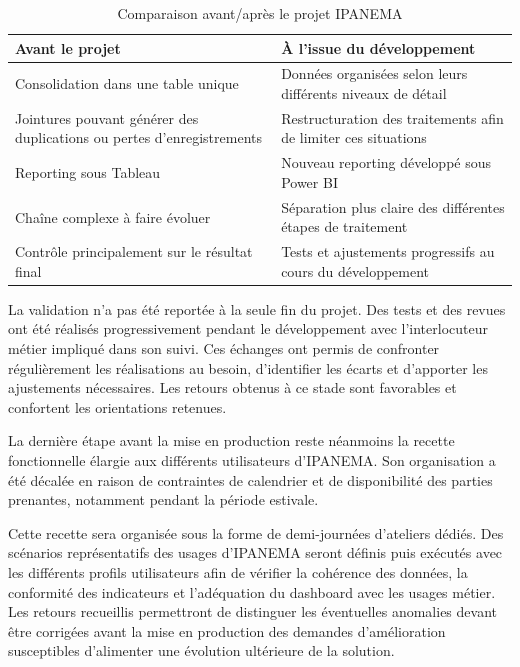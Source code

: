 \begin{table}[!ht]
\centering
\caption{Comparaison avant/après le projet IPANEMA}
\label{tab:avant-apres-ipanema}
\vspace{6pt}
\renewcommand{\arraystretch}{1.5} %
\setlength{\tabcolsep}{10pt}     %
\begin{tabular}{|>{\raggedright\arraybackslash}p{5cm}|>{\raggedright\arraybackslash}p{8.5cm}|}
\hline
\textbf{Avant le projet} & \textbf{À l'issue du développement} \\
\hline
Consolidation dans une table unique & Données organisées selon leurs différents niveaux de détail \\
\hline
Jointures pouvant générer des duplications ou pertes d'enregistrements & Restructuration des traitements afin de limiter ces situations \\
\hline
Reporting sous Tableau & Nouveau reporting développé sous Power BI \\
\hline
Chaîne complexe à faire évoluer & Séparation plus claire des différentes étapes de traitement \\
\hline
Contrôle principalement sur le résultat final & Tests et ajustements progressifs au cours du développement \\
\hline
\end{tabular}
\end{table}

La validation n'a pas été reportée à la seule fin du projet. Des tests et des revues ont 
été réalisés progressivement pendant le développement avec l'interlocuteur métier impliqué 
dans son suivi. Ces échanges ont permis de confronter régulièrement les réalisations au 
besoin, d'identifier les écarts et d'apporter les ajustements nécessaires. Les retours obtenus à 
ce stade sont favorables et confortent les orientations retenues.

La dernière étape avant la mise en production reste néanmoins la recette fonctionnelle 
élargie aux différents utilisateurs d'IPANEMA. Son organisation a été décalée en raison de 
contraintes de calendrier et de disponibilité des parties prenantes, notamment pendant la 
période estivale. 

Cette recette sera organisée sous la forme de demi-journées d'ateliers dédiés. Des 
scénarios représentatifs des usages d'IPANEMA seront définis puis exécutés avec les 
différents profils utilisateurs afin de vérifier la cohérence des données, la conformité des 
indicateurs et l'adéquation du dashboard avec les usages métier. Les retours recueillis 
permettront de distinguer les éventuelles anomalies devant être corrigées avant la mise en 
production des demandes d'amélioration susceptibles d'alimenter une évolution ultérieure de 
la solution. 

